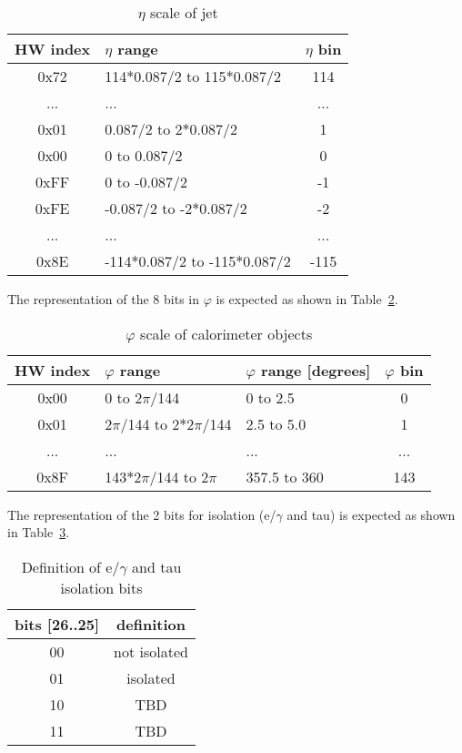 \begin{table}[htdp]
\caption{$\eta$ scale of jet}
\begin{center}
\begin{tabular}{|c|l|c|}\hline
\textbf{HW index}& \textbf{$\eta$ range} & \textbf{$\eta$ bin}\\\hline\hline
0x72 & 114$*$0.087/2 to 115$*$0.087/2 & 114\\\hline
... & ... & ...\\\hline
0x01 & 0.087/2 to 2$*$0.087/2 & 1\\\hline
0x00 & 0 to 0.087/2 & 0\\\hline
0xFF & 0 to -0.087/2 & -1\\\hline
0xFE & -0.087/2 to -2$*$0.087/2 & -2\\\hline
... & ... & ...\\\hline
0x8E & -114$*$0.087/2 to -115$*$0.087/2 & -115\\\hline
\end{tabular}
\end{center}
\label{tab:gtl:calo_eta_scale}
\end{table}

The representation of the 8 bits in $\varphi$ is expected as shown in Table~\ref{tab:gtl:calo_phi_scale}.\\
 
\begin{table}[htdp]
\begin{center}
\begin{tabular}{|c|l|l|c|}\hline
HW index & $\varphi$ range & $\varphi$ range [degrees] & $\varphi$ bin\\\hline\hline
0x00 & 0 to 2$\pi$/144 & 0 to 2.5 & 0\\\hline
0x01 & 2$\pi$/144 to 2$*$2$\pi$/144 & 2.5 to 5.0 & 1\\\hline
... & ... & ... & ...\\\hline
0x8F & 143$*$2$\pi$/144 to 2$\pi$ & 357.5 to 360 & 143\\\hline
\end{tabular}
\end{center}
\caption{$\varphi$ scale of calorimeter objects}
\label{tab:gtl:calo_phi_scale}
\end{table}

The representation of the 2 bits for isolation (e/$\gamma$ and tau) is expected as shown in Table~\ref{tab:gtl:eg_tau_iso_bits}.\\

\begin{table}[ht]
\caption{Definition of e/$\gamma$ and tau isolation bits}
\vspace{5mm}
\centering
\begin{tabular}{|c|c|}\hline
bits [26..25] & definition \\\hline\hline
00 & not isolated \\
01 & isolated \\
10 & TBD \\
11 & TBD \\\hline
\end{tabular}
\label{tab:gtl:eg_tau_iso_bits}
\end{table}

